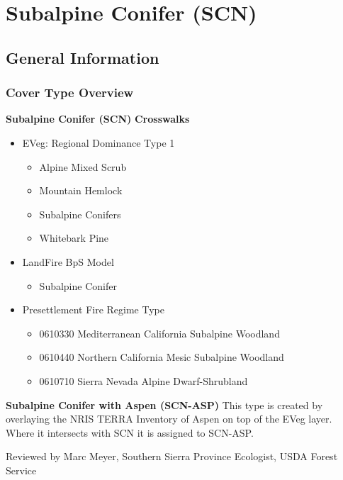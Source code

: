 \newpage
\section{Subalpine Conifer (SCN)}
\label{scn-description}

\subsection*{General Information}

\subsubsection*{Cover Type Overview}

\textbf{Subalpine Conifer (SCN)}
\newline
\textbf{Crosswalks}
\begin{itemize}
	\item EVeg: Regional Dominance Type 1
	\begin{itemize}
		\item Alpine Mixed Scrub
		\item Mountain Hemlock
		\item Subalpine Conifers
		\item Whitebark Pine
	\end{itemize}

	\item LandFire BpS Model
	\begin{itemize}
		\item Subalpine Conifer
	\end{itemize}

	\item Presettlement Fire Regime Type
	\begin{itemize}
		\item 0610330 Mediterranean California Subalpine Woodland
		\item 0610440 Northern California Mesic Subalpine Woodland
		\item 0610710 Sierra Nevada Alpine Dwarf-Shrubland
	\end{itemize}
\end{itemize}

\noindent \textbf{Subalpine Conifer with Aspen (SCN-ASP)}
This type is created by overlaying the NRIS TERRA Inventory of Aspen on top of the EVeg layer. Where it intersects with SCN it is assigned to SCN-ASP.
\newline

\noindent Reviewed by Marc Meyer, Southern Sierra Province Ecologist, USDA Forest Service


